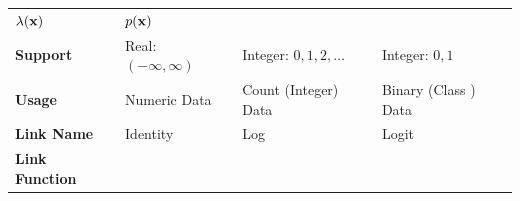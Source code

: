 \documentclass[]{book}
\begin{document}
\begin{longtable}[]{@{}llll@{}}
\begin{minipage}[t]{0.23\columnwidth}
\(\lambda({\bf x})\)\strut
\end{minipage} & \begin{minipage}[t]{0.24\columnwidth}\raggedright
\(p({\bf x})\)\strut
\end{minipage}\tabularnewline
\begin{minipage}[t]{0.20\columnwidth}\raggedright
\textbf{Support}\strut
\end{minipage} & \begin{minipage}[t]{0.21\columnwidth}\raggedright
Real: \((-\infty, \infty)\)\strut
\end{minipage} & \begin{minipage}[t]{0.23\columnwidth}\raggedright
Integer: \(0, 1, 2, \ldots\)\strut
\end{minipage} & \begin{minipage}[t]{0.24\columnwidth}\raggedright
Integer: \(0, 1\)\strut
\end{minipage}\tabularnewline
\begin{minipage}[t]{0.20\columnwidth}\raggedright
\textbf{Usage}\strut
\end{minipage} & \begin{minipage}[t]{0.21\columnwidth}\raggedright
Numeric Data\strut
\end{minipage} & \begin{minipage}[t]{0.23\columnwidth}\raggedright
Count (Integer) Data\strut
\end{minipage} & \begin{minipage}[t]{0.24\columnwidth}\raggedright
Binary (Class ) Data\strut
\end{minipage}\tabularnewline
\begin{minipage}[t]{0.20\columnwidth}\raggedright
\textbf{Link Name}\strut
\end{minipage} & \begin{minipage}[t]{0.21\columnwidth}\raggedright
Identity\strut
\end{minipage} & \begin{minipage}[t]{0.23\columnwidth}\raggedright
Log\strut
\end{minipage} & \begin{minipage}[t]{0.24\columnwidth}\raggedright
Logit\strut
\end{minipage}\tabularnewline
\begin{minipage}[t]{0.20\columnwidth}\raggedright
\textbf{Link Function}\strut
\end{minipage} & \begin{minipage}[t]{0.21\columnwidth}\raggedright

\end{minipage}
\end{longtable}
\end{document}
